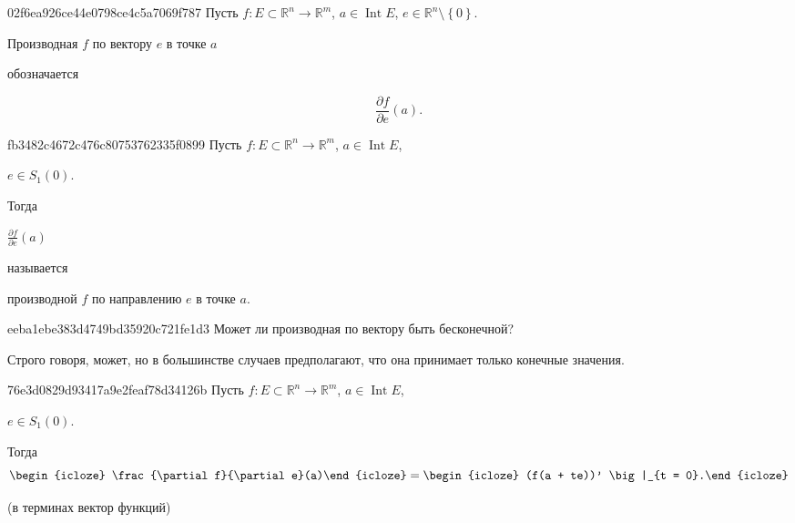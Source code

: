 \begin{note}{02f6ea926ce44e0798ce4c5a7069f787}
    Пусть \({ f : E \subset \mathbb R^{n} \to \mathbb R^{m} }\), \({ a \in \operatorname{Int} E }\),\: \({ e \in \mathbb R^{n} \setminus \left\{ 0 \right\} }\).
    \begin{icloze}{2}Производная \({ f }\) по вектору \({ e }\) в точке \({ a }\)\end{icloze} обозначается
    \begin{icloze}{1}
        \[
            \frac{\partial f}{\partial e}(a).
        \]
    \end{icloze}
\end{note}

\begin{note}{fb3482c4672c476c80753762335f0899}
    Пусть \({ f : E \subset \mathbb R^{n} \to \mathbb R^{m} }\), \({ a \in \operatorname{Int} E }\),\: \begin{icloze}{3}\({ e \in S_1(0) }\).\end{icloze}
    Тогда \begin{icloze}{2}\({ \frac{\partial f}{\partial e}(a) }\)\end{icloze} называется \begin{icloze}{1}производной \({ f }\) по направлению \({ e }\) в точке \({ a }\).\end{icloze}
\end{note}

\begin{note}{eeba1ebe383d4749bd35920c721fe1d3}
    Может ли производная по вектору быть бесконечной?

    \begin{cloze}{1}
        Строго говоря, может, но в большинстве случаев предполагают, что она принимает только конечные значения.
    \end{cloze}
\end{note}

\begin{note}{76e3d0829d93417a9e2feaf78d34126b}
    Пусть \({ f : E \subset \mathbb R^{n} \to \mathbb R^{m} }\), \({ a \in \operatorname{Int} E }\),\: \begin{icloze}{3}\({ e \in S_1(0) }\).\end{icloze}
    Тогда
    \[
        \begin{icloze}{2}\frac{\partial f}{\partial e}(a)\end{icloze} = \begin{icloze}{1}(f(a + te))' \big|_{t = 0}.\end{icloze}
    \]

    \begin{center}
        \tiny
        (в терминах вектор функций)
    \end{center}
\end{note}


